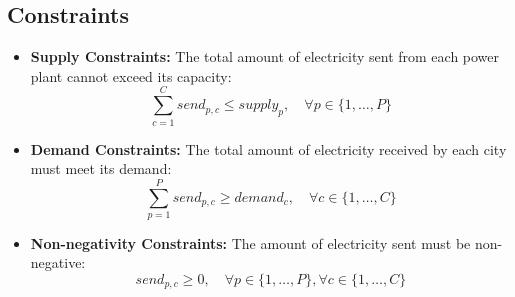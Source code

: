 \documentclass{article}
\begin{document}
\subsection*{Constraints}
\begin{itemize}
    \item \textbf{Supply Constraints:} The total amount of electricity sent from each power plant cannot exceed its capacity:
    \[
    \sum_{c=1}^{C} send_{p,c} \leq supply_{p}, \quad \forall p \in \{1, \ldots, P\}
    \]

    \item \textbf{Demand Constraints:} The total amount of electricity received by each city must meet its demand:
    \[
    \sum_{p=1}^{P} send_{p,c} \geq demand_{c}, \quad \forall c \in \{1, \ldots, C\}
    \]

    \item \textbf{Non-negativity Constraints:} The amount of electricity sent must be non-negative:
    \[
    send_{p,c} \geq 0, \quad \forall p \in \{1, \ldots, P\}, \forall c \in \{1, \ldots, C\}
    \]
\end{itemize}
\end{document}
